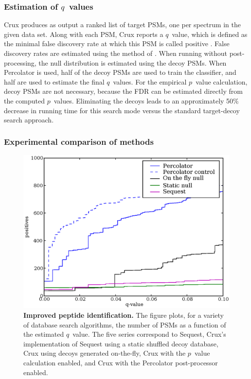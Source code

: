 \documentclass[12pt]{article}
\begin{document}
\subsubsection{Estimation of $q$~values}
\label{section:q-value}

Crux produces as output a ranked list of target PSMs, one per spectrum
in the given data set.  Along with each PSM, Crux reports a $q$~value,
which is defined as the minimal false discovery rate at which this PSM
is called positive \cite{storey:statistical}.  False discovery rates
are estimated using the method of \cite{benjamini:controlling}.  When
running without post-processing, the null distribution is estimated
using the decoy PSMs.  When Percolator is used, half of the decoy PSMs
are used to train the classifier, and half are used to estimate the
final $q$~values.  For the empirical $p$~value calculation, decoy PSMs
are not necessary, because the FDR can be estimated directly from the
computed $p$~values.  Eliminating the decoys leads to an approximately
50\% decrease in running time for this search mode versus the standard
target-decoy search approach.

\subsubsection{Experimental comparison of methods}
\label{section:experimental}

\begin{figure}
\centering
\includegraphics[width=5in]{./Images/q-value.eps}
\caption{{\bf Improved peptide identification.}  The figure plots, for
  a variety of database search algorithms, the number of PSMs as a
  function of the estimated $q$~value.  The five series correspond to
  {\sc Sequest}, Crux's implementation of {\sc Sequest} using a static 
  shuffled decoy
  database, Crux using decoys generated on-the-fly, Crux with the
  $p$~value calculation enabled, and Crux with the
  Percolator post-processor enabled. 
  \label{figure:pq-plot}}
\end{figure}
\end{document}
